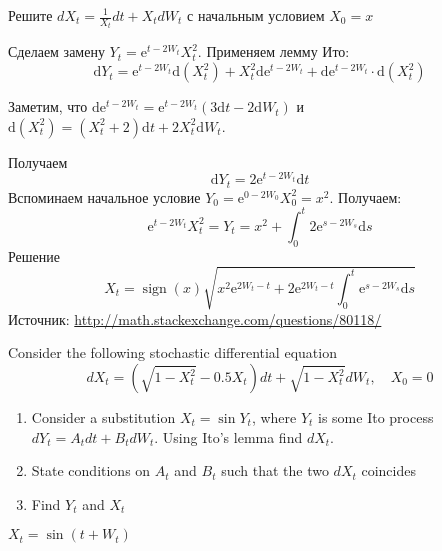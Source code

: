 \begin{problem}
Решите $dX_t=\frac{1}{X_t}dt+X_tdW_t$ с начальным условием  $X_0=x$
\end{problem} 
\begin{solution} 
Сделаем замену $Y_t = \mathrm{e}^{t- 2 W_t} X_t^2$. Применяем лемму Ито:
\begin{equation}
  \mathrm{d} Y_t = \mathrm{e}^{t- 2 W_t} \mathrm{d} (X_t^2) + X_t^2 \mathrm{d} \mathrm{e}^{t- 2 W_t} + \mathrm{d} \mathrm{e}^{t- 2 W_t} \cdot \mathrm{d} (X_t^2) 
\end{equation}

Заметим, что $\mathrm{d} \mathrm{e}^{t- 2 W_t} = \mathrm{e}^{t- 2 W_t} \left( 3 \mathrm{d} t - 2 \mathrm{d} W_t \right)$ и $\mathrm{d}(X_t^2) = (X_t^2 + 2) \mathrm{d} t + 2 X_t^2 \mathrm{d} W_t$.

Получаем
\begin{equation}
  \mathrm{d} Y_t = 2 \mathrm{e}^{t- 2 W_t} \mathrm{d} t
\end{equation}
Вспоминаем начальное условие $Y_0 = \mathrm{e}^{0 - 2 W_0}X_0^2 = x^2$. Получаем:
\begin{equation}
   \mathrm{e}^{t- 2 W_t} X_t^2 = Y_t =  x^2 + \int_0^t 2 \mathrm{e}^{s - 2 W_s} \mathrm{d} s 
\end{equation}
Решение
\begin{equation}
  X_t = \operatorname{sign}(x) \sqrt{ x^2 \mathrm{e}^{2 W_t - t} + 2 \mathrm{e}^{2 W_t - t} \int_0^t \mathrm{e}^{s - 2 W_s} \mathrm{d} s  }
\end{equation}
Источник: \url{http://math.stackexchange.com/questions/80118/}

\end{solution}

\begin{problem}
Consider the following stochastic differential equation
\begin{equation}
dX_t=(\sqrt{1-X_t^2}-0.5X_t)dt+\sqrt{1-X_t^2}dW_t, \quad X_0=0
\end{equation}
\begin{enumerate}
\item Consider a substitution $X_t=\sin Y_t$, where $Y_t$ is some Ito process $dY_t=A_tdt+B_tdW_t$. Using Ito's lemma find $dX_t$.
\item State conditions on $A_t$ and $B_t$ such that the two $dX_t$ coincides
\item Find $Y_t$ and $X_t$
\end{enumerate}
\end{problem} 
\begin{solution} 
$X_t=\sin(t+W_t)$
\end{solution}

